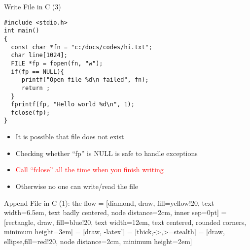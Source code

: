 \begin{frame}[fragile]{Write File in C (3)}
\vspace{-0.1in}
\begin{lstlisting}[xleftmargin=0.06\linewidth, linewidth=0.85\linewidth]
#include <stdio.h>
int main()
{
  const char *fn = "c:/docs/codes/hi.txt";
  char line[1024];
  FILE *fp = fopen(fn, "w");
  if(fp == NULL){
     printf("Open file %d\n failed", fn);
     return ;
  }
  fprintf(fp, "Hello world %d\n", 1);
  fclose(fp); 
}
\end{lstlisting}
\vspace{-0.2in}
\begin{itemize}
	\item {It is possible that file does not exist}
	\item {Checking whether ``fp'' is NULL is safe to handle exceptions}
	\item {\textcolor{red}{Call ``fclose'' all the time when you finish writing}}
	\item {Otherwise no one can write/read the file}
\end{itemize}
\end{frame}

\begin{frame}[fragile]{Append File in C (1): the flow}
 = [diamond, draw, fill=yellow!20, 
    text width=6.5em, text badly centered, node distance=2cm, inner sep=0pt]
 = [rectangle, draw, fill=blue!20, 
    text width=12em, text centered, rounded corners, minimum height=3em]
 = [draw, -latex']
 = [thick,->,>=stealth]
 = [draw, ellipse,fill=red!20, node distance=2cm,
    minimum height=2em]
\begin{center}


\end{center}
\end{frame}

